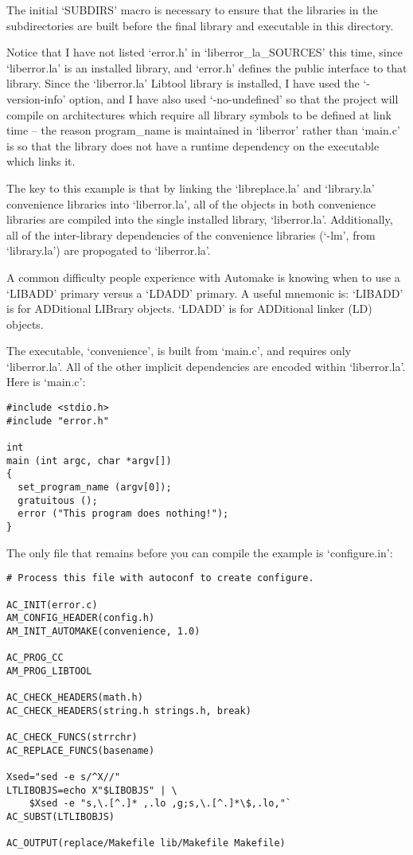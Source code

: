 The initial `SUBDIRS' macro is necessary to ensure that the libraries in the subdirectories are built before the final library and executable in this directory. 


Notice that I have not listed `error.h' in `liberror\_{}la\_{}SOURCES' this time, since `liberror.la' is an installed library, and `error.h' defines the public interface to that library. Since the `liberror.la' Libtool library is installed, I have used the `-version-info' option, and I have also used `-no-undefined' so that the project will compile on architectures which require all library symbols to be defined at link time -- the reason program\_{}name is maintained in `liberror' rather than `main.c' is so that the library does not have a runtime dependency on the executable which links it. 


The key to this example is that by linking the `libreplace.la' and `library.la' convenience libraries into `liberror.la', all of the objects in both convenience libraries are compiled into the single installed library, `liberror.la'. Additionally, all of the inter-library dependencies of the convenience libraries (`-lm', from `library.la') are propogated to `liberror.la'. 


A common difficulty people experience with Automake is knowing when to use a `LIBADD' primary versus a `LDADD' primary. A useful mnemonic is: `LIBADD' is for ADDitional LIBrary objects. `LDADD' is for ADDitional linker (LD) objects. 

The executable, `convenience', is built from `main.c', and requires only `liberror.la'. All of the other implicit dependencies are encoded within `liberror.la'. Here is `main.c': 

\begin{Verbatim}[frame=single]
#include <stdio.h>
#include "error.h"

int
main (int argc, char *argv[])
{
  set_program_name (argv[0]);
  gratuitous ();
  error ("This program does nothing!");
}
\end{Verbatim}

The only file that remains before you can compile the example is `configure.in': 

\begin{Verbatim}[frame=single]
# Process this file with autoconf to create configure.

AC_INIT(error.c)
AM_CONFIG_HEADER(config.h)
AM_INIT_AUTOMAKE(convenience, 1.0)

AC_PROG_CC
AM_PROG_LIBTOOL

AC_CHECK_HEADERS(math.h)
AC_CHECK_HEADERS(string.h strings.h, break)

AC_CHECK_FUNCS(strrchr)
AC_REPLACE_FUNCS(basename)

Xsed="sed -e s/^X//"
LTLIBOBJS=echo X"$LIBOBJS" | \
    $Xsed -e "s,\.[^.]* ,.lo ,g;s,\.[^.]*\$,.lo,"`
AC_SUBST(LTLIBOBJS)

AC_OUTPUT(replace/Makefile lib/Makefile Makefile)
\end{Verbatim}

